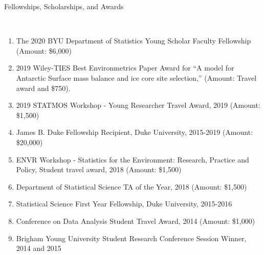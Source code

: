 \documentclass[11pt]{article}
\newcommand{\head}[1]{ %
    \bigskip %
    \begin{large}\begin{bf}{#1}\end{bf}\end{large} %

    \ \\ [-1.3cm] %

    \hrulefill}
\begin{document}
\head{Fellowships, Scholarships, and Awards}
\begin{enumerate}[label=$\bullet$]

\item The 2020 BYU Department of Statistics Young Scholar Faculty Fellowship (Amount: \$6,000)
\item 2019 Wiley-TIES Best Environmetrics Paper Award for ``A model for Antarctic Surface mass balance and ice core site selection,''  (Amount: Travel award and \$750).
\item 2019 STATMOS Workshop - Young Researcher Travel Award, 2019  (Amount: \$1,500)

\item James B. Duke Fellowship Recipient, Duke University, 2015-2019 (Amount: \$20,000)
\item ENVR Workshop - Statistics for the Environment: Research, Practice and Policy, Student travel award, 2018 (Amount: \$1,500)
\item Department of Statistical Science TA of the Year, 2018 (Amount: \$1,500)
\item Statistical Science First Year Fellowship, Duke University, 2015-2016 
\item Conference on Data Analysis Student Travel Award, 2014 (Amount: \$1,000)
\item Brigham Young University Student Research Conference Session Winner, 2014 and 2015

\end{enumerate}
\end{document}
